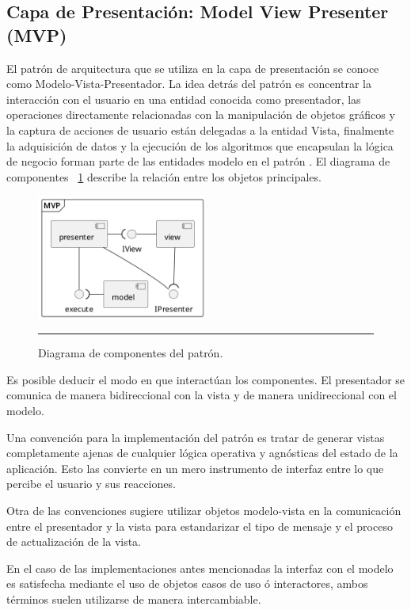 \subsection{Capa de Presentación: Model View Presenter (MVP)}
El patrón de arquitectura que se utiliza en la capa de presentación se conoce como Modelo-Vista-Presentador.
La idea detrás del patrón es concentrar la interacción con el usuario en una entidad conocida como presentador, las operaciones directamente relacionadas con la manipulación de objetos gráficos y la captura de acciones de usuario están delegadas a la entidad Vista, finalmente la adquisición de datos y la ejecución de los algoritmos que encapsulan la lógica de negocio forman parte de las entidades modelo en el patrón \cite{mvp_leiva}.
El diagrama de componentes ~\ref{fig:uml_mvp_component} describe la relación entre los objetos principales.


\begin{figure}[htbp]
	\centering
	\includegraphics[width=0.5\textwidth]{Figures/design/COMP_mvp.png}
	\rule{35em}{1pt}
	\caption[MVP Components]{Diagrama de componentes del patrón.}
	\label{fig:uml_mvp_component}
\end{figure}

Es posible deducir el modo en que interactúan los componentes. El presentador se comunica de manera bidireccional con la vista y de manera unidireccional con el modelo.

Una convención para la implementación del patrón es tratar de generar vistas completamente ajenas de cualquier lógica operativa y agnósticas del estado de la aplicación. Esto las convierte en un mero instrumento de interfaz entre lo que percibe el usuario y sus reacciones. 

Otra de las convenciones sugiere utilizar objetos modelo-vista en la comunicación entre el presentador y la vista para estandarizar el tipo de mensaje y el proceso de actualización de la vista.

En el caso de las implementaciones antes mencionadas la interfaz con el modelo es satisfecha mediante el uso de objetos casos de uso ó interactores, ambos términos suelen utilizarse de manera intercambiable.

